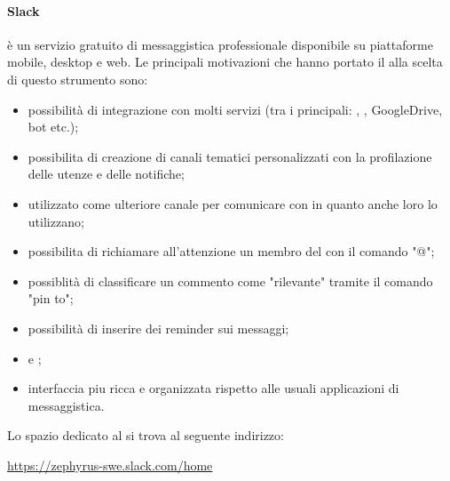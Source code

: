             \paragraph{Slack}
	        \label{sec:Slack}
             è un servizio gratuito  di messaggistica professionale disponibile su piattaforme mobile, desktop e web. Le principali motivazioni che hanno portato il  alla scelta di questo strumento sono:
            \begin{itemize}
            	\item possibilità di integrazione con molti servizi (tra i principali: , , GoogleDrive, bot etc.);
            	\item possibilita di creazione di canali tematici personalizzati con la profilazione delle utenze e delle notifiche;
            	\item utilizzato come ulteriore canale per comunicare con \riskapp{} in quanto anche loro lo utilizzano;
            	\item possibilita di richiamare all'attenzione un membro del  con il comando "@";
            	\item possiblità di classificare  un commento  come "rilevante" tramite il comando "pin to";
            	\item possibilità di inserire dei reminder sui messaggi;
            	\item {} e ;
            	\item interfaccia piu ricca e organizzata rispetto alle usuali applicazioni di messaggistica.
            \end{itemize}
            Lo spazio dedicato al  si trova al seguente indirizzo:
            \begin{center}
            	\url{https://zephyrus-swe.slack.com/home}
            \end{center}
